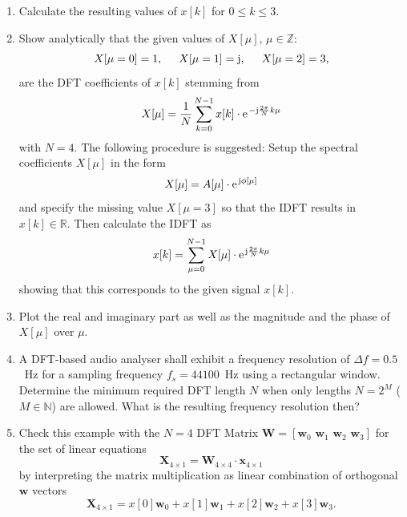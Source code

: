 \documentclass[11pt,a4paper,DIV=12]{scrartcl}
\begin{document}
\begin{enumerate}[label=\alph*)]
	\item Calculate the resulting values of $x[k]$ for $0\leq k\leq3$.
%
	\item Show analytically that the given values of $X[\mu]$, $\mu\in\mathbb{Z}$:
	\begin{equation}
	X[\mu=0]=1, \hspace{5mm} X[\mu=1]=\im, \hspace{5mm} X[\mu=2]=3,
	\end{equation}
	are the DFT coefficients of $x[k]$ stemming from
	\begin{equation}
	X[\mu]=\frac{1}{N}\sum_{k=0}^{N-1}x[k]\cdot\e^{-\im\frac{2\pi}{N}k\mu}
	\end{equation}
	with $N=4$.
%
	The following procedure is suggested: Setup the spectral
	coefficients $X[\mu]$ in the form
	\begin{equation}
	X[\mu]=A[\mu]\cdot\e^{\im\phi[\mu]}
	\end{equation}
	and specify the missing value $X[\mu=3]$ so that the IDFT results in
	$x[k]\in\mathbb{R}$.
%
	Then calculate the IDFT as
	\begin{equation}
	x[k]=\sum_{\mu=0}^{N-1}X[\mu]\cdot\e^{\im\frac{2\pi}{N}k\mu}
	\end{equation}
	showing that this corresponds to the given signal $x[k]$.
%
	\item Plot the real and imaginary part as well as the magnitude and the phase
	of $X[\mu]$ over $\mu$.
%
	\item A DFT-based audio analyser shall exhibit a frequency resolution of
	$\Delta f=0.5$~Hz for a sampling frequency $f_s=44100$~Hz using a rectangular
	window.
%
	Determine the minimum required DFT length $N$ when only lengths $N=2^M$
	($M\in\mathbb{N}$) are allowed.
%
	What is the resulting frequency resolution then?
%
	\item Check this example with the $N=4$ DFT Matrix
	$\mathbf{W} =[\mathbf{w}_0\,\,\mathbf{w}_1\,\,\mathbf{w}_2\,\,\mathbf{w}_3]$
	for the set of linear equations
	\begin{equation}
	\mathbf{X}_{4\times1} = \mathbf{W}_{4\times4} \cdot \mathbf{x}_{4\times1}
	\end{equation}
	by interpreting the matrix multiplication as linear combination of orthogonal
	$\mathbf{w}$ vectors
	\begin{equation}
	\mathbf{X}_{4\times1} = x[0] \mathbf{w}_0
	+ x[1] \mathbf{w}_1 + x[2] \mathbf{w}_2 + x[3] \mathbf{w}_3.
	\end{equation}
\end{enumerate}
\end{document}
